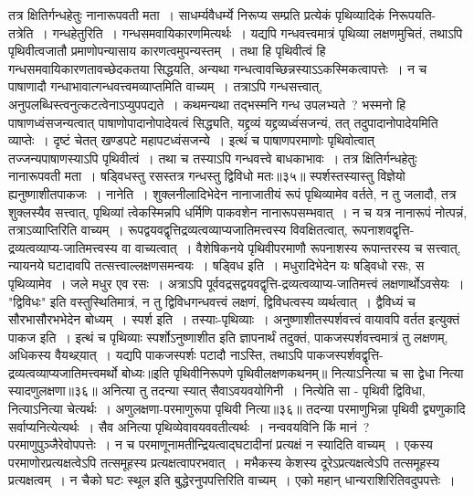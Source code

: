 तत्र क्षितिर्गन्धहेतुः नानारूपवती मता~।
साधर्म्यवैधर्म्ये निरूप्य सम्प्रति प्रत्येकं पृथिव्यादिकं निरूपयति-तत्रेति~। गन्धहेतुरिति~। गन्धसमवायिकारणमित्यर्थः~। यद्यपि गन्धवत्त्वमात्रं पृथिव्या लक्षणमुचितं,
तथाऽपि पृथिवीत्वजातौ प्रमाणोपन्यासाय कारणत्वमुपन्यस्तम्~। तथा हि पृथिवीत्वं हि गन्धसमवायिकारणतावच्छेदकतया सिद्धयति, अन्यथा गन्धत्वावच्छिन्नस्याऽऽकस्मिकत्वापत्तेः~।
न च पाषाणादौ गन्धाभावात्गन्धवत्त्वमव्याप्तमिति वाच्यम्~। तत्राऽपि गन्धसत्त्वात्, अनुपलब्धिस्त्वनुत्कटत्वेनाऽप्युपपद्यते~। कथमन्यथा तद्भस्मनि गन्ध
उपलभ्यते~? भस्मनो हि पाषाणध्वंसजन्यत्वात् पाषाणोपादानोपादेयत्वं सिद्ध्यति, यद्द्रव्यं यद्द्रव्यध्वंंसजन्यं, तत् तदुपादानोपादेयमिति व्याप्तेः~। दृष्टं चेतत् खण्डपटे
महापटध्वंसजन्ये~। इत्थंं च पाषाणपरमाणोः पृथिवोत्वात् तज्जन्यपाषाणस्याऽपि पृथिवीत्वं~। तथा च तस्याऽपि गन्धवत्त्वे बाधकाभावः~।
तत्र क्षितिर्गन्धहेतुः नानारूपवती मता~।
षड्विधस्तु रसस्तत्र गन्धस्तु द्विविधो मतः॥३५॥
स्पर्शस्तस्यास्तु विज्ञेयो ह्यनुष्णाशीतपाकजः~।
नानेति~। शुक्लनीलादिभेदेन नानाजातीयं रूपं पृथिव्यामेव वर्तते, न तु जलादौ, तत्र शुक्लस्यैव सत्त्वात्, पृथिव्यां त्वेकस्मिन्नपि धर्मिणि पाकवशेन
नानारूपसम्भवात्~। न च यत्र नानारूपं नोत्पन्नं, तत्राऽव्याप्तिरिति वाच्यम्~। रूपद्वयवद्वृत्तिद्रव्यत्वव्याप्यजातिमत्त्वस्य विवक्षितत्वात्, रूपनाशवद्वृत्ति-द्रव्यत्वव्याप्य-जातिमत्त्वस्य
वा वाच्यत्वात्~। वैशेषिकनये पृथिवीपरमाणौ रूपनाशस्य रूपान्तरस्य च सत्त्वात्, न्यायनये घटादावपि तत्सत्त्वाल्लक्षणसमन्वयः~।
षड्विध इति~। मधुरादिभेदेन यः षड्विधो रसः, स पृथिव्यामेव~। जले मधुर एव रसः~। अत्राऽपि पूर्ववद्रसद्वयवद्वृत्ति-द्रव्यत्वव्याप्य-जातिमत्त्वं लक्षणार्थोऽवसेयः~।
"द्विविधः" इति वस्तुस्थितिमात्रं, न तु द्विविधगन्धवत्त्वं लक्षणं, द्विविधत्वस्य व्यर्थत्वात्~। द्वैविध्यं च सौरभासौरभभेदेन बोध्यम्~।
स्पर्श इति~। तस्याः-पृथिव्याः~। अनुष्णाशीतस्पर्शवत्त्वं वायावपि वर्तत इत्युक्तं पाकज इति~। इत्थं च पृथिव्याः स्पर्शोऽनुष्णाशीत इति ज्ञापनार्थं तदुक्तं, पाकजस्पर्शवत्त्वमात्रं
तु लक्षणम्, अधिकस्य वैयथ्र्र्यात्~। यद्यपि पाकजस्पर्शः पटादौ नाऽस्ति, तथाऽपि पाकजस्पर्शवद्वृत्ति-द्रव्यत्वव्याप्यजातिमत्त्वमर्थो बोध्यः॥इति पृथिवीनिरूपणे पृथिवीलक्षणकथनम्॥
नित्याऽनित्या च सा द्वेधा नित्या स्यादणुलक्षणा॥३६॥
अनित्या तु तदन्या स्यात् सैवाऽवयवयोगिनी~।
नित्येति सा - पृथिवी द्विविधा, नित्याऽनित्या चेत्यर्थः~।
अणुलक्षणा-परमाणुरूपा पृथिवी नित्या॥३६॥
तदन्या परमाणुभिन्ना पृथिवी द्व्यणुकादि सर्वाप्यनित्येत्यर्थः~। सैव अनित्या पृथिव्येवावयववतीत्यर्थः~।
नन्ववयविनि किं मानं~? परमाणुपुञ्जैरेवोपपत्तेः~। न च परमाणूनामतीन्द्रियत्वाद्घटादीनां प्रत्यक्षं न स्यादिति वाच्यम्~। एकस्य परमाणोरप्रत्यक्षत्वेऽपि तत्समूहस्य
प्रत्यक्षत्वापरभवात्~। मभैकस्य केशस्य दूरेऽप्रत्यक्षत्वेऽपि तत्समूहस्य प्रत्यक्षत्वम्~। न चैको घटः स्थूल इति बुद्धेरनुपपत्तिरिति वाच्यम्~। एको महान् धान्यराशिरितिवदुपपत्तेः~।

